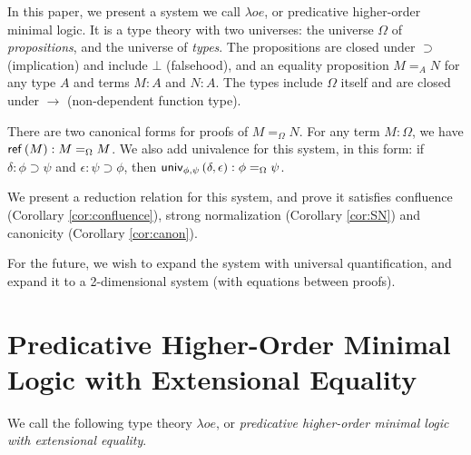 In this paper, we present a system we call $\lambda o e$, or predicative higher-order minimal logic.  It is a type theory with two universes: the universe $\Omega$
of \emph{propositions}, and the universe of \emph{types}.  The propositions are closed under $\supset$ (implication) and include $\bot$ (falsehood), and an equality proposition $M =_A N$ for
any type $A$ and terms $M : A$ and $N : A$.  The types include $\Omega$ itself and are closed under $\rightarrow$ (non-dependent function type).

There are two canonical forms for proofs of $M =_\Omega N$.  For any term $M : \Omega$, we have $\mathsf{ref} \left( {M} \right) : M =_\Omega M$.  We also add univalence for this system, in this form:
if $\delta : \phi \supset \psi$ and $\epsilon : \psi \supset\phi$, then $\mathsf{univ}_{{\phi} , {\psi}} \left( {\delta} , {\epsilon} \right) : \phi =_\Omega \psi$.  

We present a reduction relation for this system, and prove it satisfies confluence (Corollary \ref{cor:confluence}), strong normalization (Corollary \ref{cor:SN}) and canonicity (Corollary \ref{cor:canon}).

For the future, we wish to expand the system with universal quantification, and expand it to a 2-dimensional system (with equations between proofs).

\section{Predicative Higher-Order Minimal Logic with Extensional Equality}

We call the following type theory $\lambda o e$, or \emph{predicative higher-order minimal logic with extensional equality}.  



%











